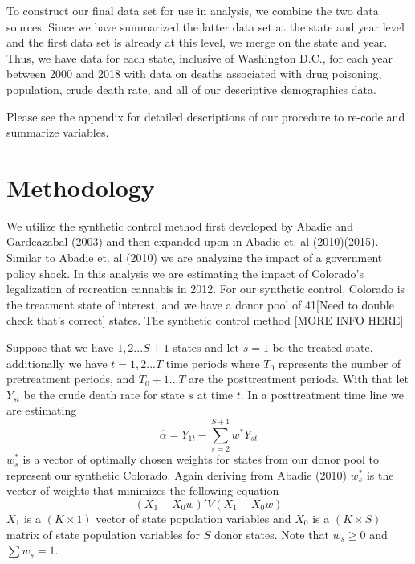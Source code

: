 \documentclass{article}
\begin{document}
To construct our final data set for use in analysis, we combine the two data sources. Since we have summarized the latter data set at the state and year level and the first data set is already at this level, we merge on the state and year. Thus, we have data for each state, inclusive of Washington D.C., for each year between 2000 and 2018 with data on deaths associated with drug poisoning, population, crude death rate, and all of our descriptive demographics data.



Please see the appendix for detailed descriptions of our procedure to re-code and summarize variables.

\section{Methodology}

We utilize the synthetic control method first developed by Abadie and Gardeazabal (2003) and then expanded upon in Abadie et. al (2010)(2015). Similar to Abadie et. al (2010) we are analyzing the impact of a government policy shock. In this analysis we are estimating the impact of Colorado's legalization of recreation cannabis in 2012. For our synthetic control, Colorado is the treatment state of interest, and we have a donor pool of 41[Need to double check that's correct] states. The synthetic control method [MORE INFO HERE]

Suppose that we have $1,2...S+1$ states and let $s = 1$ be the treated state, additionally we have $t = 1,2...T$ time periods where $T_0$ represents the number of pretreatment periods, and $T_0 + 1...T$ are the posttreatment periods. With that let $Y_{st}$ be the crude death rate for state $s$ at time $t$. In a posttreatment time line we are estimating
\begin{equation*}
\hat{\alpha} = Y_{1t} - \sum_{s=2}^{S+1}w^{*}Y_{st}
\end{equation*}
$w^{*}_s$ is a vector of optimally chosen weights for states from our donor pool to represent our synthetic Colorado. Again deriving from Abadie (2010) $w^{*}_s$ is the vector of weights that minimizes the following equation
\begin{equation*}
(X_1 - X_0w)'V(X_1 - X_0w)
\end{equation*}
$X_1$ is a $(K \times 1)$ vector of state population variables and $X_0$ is a $(K \times S)$ matrix of state population variables for $S$ donor states. Note that $w_s \geq 0$ and $\sum w_s = 1$.
\end{document}
